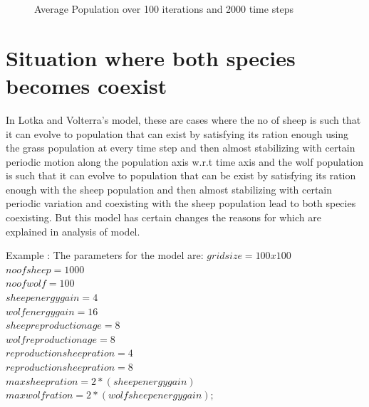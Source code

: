 \documentclass[prl,12pt,citeautoscript,reprint]{revtex4-1}
\begin{document}
\begin{itemize}
\begin{figure}[H]
\caption{Average Population over 100 iterations and 2000 time steps}\label{Fig:Cellular matrix at 2000 time step}
\end{figure}

\end{itemize}

\section{Situation where both species becomes coexist}
In Lotka and Volterra's model, these are cases where the no of sheep is such that it can evolve to population that can exist by satisfying its ration enough using the grass population at every time step and then almost stabilizing with certain periodic motion along the population axis w.r.t time axis and the wolf population is such that it can evolve to population that can be exist by satisfying its ration enough with the sheep population and then almost stabilizing with certain periodic variation and coexisting with the sheep population lead to both species coexisting. But this model has certain changes the reasons for which are explained in analysis of model.

Example : \newline
The parameters for the model are:\newline
$ grid size = 100x100 $\\
$no of sheep=1000$\\
$no of wolf=100$\\
$sheep energy gain = 4$\\
$wolf energy gain = 16$\\
$sheep reproduction age=8$\\
$wolf reproduction age=8$\\
$reproduction sheep ration=4$\\
$reproduction sheep ration=8$\\
$max sheep ration=2*(sheep energy gain)$\\
$max wolf ration=2*(wolf sheep energy gain);$\\
 
\end{document}
